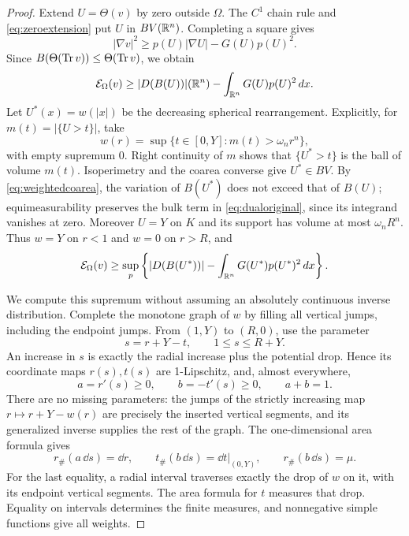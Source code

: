 \begin{proof}
Extend \(U=\Theta(v)\) by zero outside \(\Omega\). The \(C^1\) chain
rule and \eqref{eq:zeroextension} put \(U\) in \(BV(\mathbb R^n)\).
Completing a square gives
\[
 |\nabla v|^2\ge p(U)|\nabla U|-G(U)p(U)^2 .
\]
Since \(B(\Theta(\operatorname{Tr} v))\le\Theta(\operatorname{Tr} v)\), we obtain
\begin{equation}\label{eq:dualoriginal}
 \mathcal E_\Omega(v)\ge |D(B(U))|(\mathbb R^n)-
                                       \int_{\mathbb R^n}G(U)p(U)^2\,d x.
\end{equation}
Let \(U^*(x)=w(|x|)\) be the decreasing spherical rearrangement.
Explicitly, for \(m(t)=|\{U>t\}|\), take
\[
 w(r)=\sup\{t\in[0,Y]:m(t)>\omega_n r^n\},
\]
with empty supremum 0. Right continuity of \(m\) shows that
\(\{U^*>t\}\) is the ball of volume \(m(t)\).
Isoperimetry and the coarea converse give \(U^*\in BV\).
By \eqref{eq:weightedcoarea}, the variation of \(B(U^*)\) does not
exceed that of \(B(U)\); equimeasurability preserves the bulk term
in \eqref{eq:dualoriginal}, since its integrand vanishes at zero.
Moreover \(U=Y\) on \(K\) and its support has volume at most
\(\omega_nR^n\). Thus \(w=Y\) on \(r<1\) and \(w=0\) on \(r>R\), and
\begin{equation}\label{eq:radialdual}
 \mathcal E_\Omega(v)\ge
 \sup_p\left\{|D(B(U^*))|-\int_{\mathbb R^n}G(U^*)p(U^*)^2\,d x\right\}.
\end{equation}

We compute this supremum without assuming an absolutely continuous
inverse distribution. Complete the monotone graph of \(w\) by filling
all vertical jumps, including the endpoint jumps. From \((1,Y)\)
to \((R,0)\), use the parameter
\[
 s=r+Y-t,\qquad1\le s\le R+Y.
\]
An increase in \(s\) is exactly the radial increase plus the potential
drop. Hence its coordinate maps \(r(s),t(s)\) are 1-Lipschitz,
and, almost everywhere,
\[
 a=r'(s)\ge0,\qquad b=-t'(s)\ge0,\qquad a+b=1.
\]
There are no missing parameters: the jumps of the strictly increasing
map \(r\mapsto r+Y-w(r)\) are precisely the inserted vertical segments,
and its generalized inverse supplies the rest of the graph.
The one-dimensional area formula gives
\begin{equation}\label{eq:pushforwards}
 r_\#(a\,\dd s)=\dd r,\qquad
 t_\#(b\,\dd s)=\dd t|_{(0,Y)},\qquad r_\#(b\,\dd s)=\mu.
\end{equation}
For the last equality, a radial interval traverses exactly the drop
of \(w\) on it, with its endpoint vertical segments. The area formula
for \(t\) measures that drop. Equality on intervals determines the
finite measures, and nonnegative simple functions give all weights.


\end{proof}
